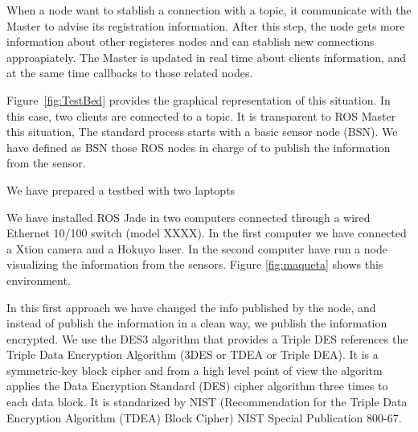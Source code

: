 \documentclass[journal,twoside]{JoPhA}
\begin{document}
When a node want to stablish a connection with a topic, it communicate with the Master to advise its registration information. After this step, the node gets more information about other registeres nodes and can stablish new connections approapiately. The Master is updated in real time about clients information, and at the same time callbacks to those related nodes.




Figure~\ref{fig:TestBed} provides the graphical representation of this situation. In this case, two clients are connected to a topic. It is transparent to ROS Master this situation,  
The standard process starts with a basic sensor node (BSN). We have defined as BSN those ROS nodes in charge of to publish the information from the sensor.



We have prepared a  testbed with two laptopts 


We have installed ROS Jade in two computers connected through a wired Ethernet 10/100 switch (model XXXX). In the first computer we have connected a Xtion camera and a Hokuyo laser. In the second computer have run a node visualizing the information from the sensors. Figure \ref{fig:maqueta} shows this environment.



In this first approach we have changed the info published by the node, and instead of publish the information in a clean way, we publish the information encrypted.
We use the DES3 algorithm that provides a 
Triple DES references the Triple Data Encryption Algorithm (3DES or TDEA or Triple DEA). It is a symmetric-key block cipher and from a high level point of view the algoritm applies the Data Encryption Standard (DES) cipher algorithm three times to each data block. It is standarized by NIST (Recommendation for
the Triple Data Encryption Algorithm (TDEA) Block Cipher) NIST Special Publication 800-67.
\end{document}
